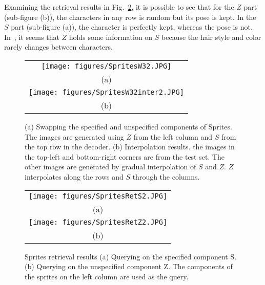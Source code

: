 \documentclass[10pt,twocolumn,letterpaper]{article}
\begin{document}
Examining the retrieval results in Fig.~\ref{fig3_Spritesret}, it is possible to see that for the $Z$ part (sub-figure (b)), the characters in any row is random but its pose is kept. In the $S$ part (sub-figure (a)), the character is perfectly kept, whereas the pose is not. In~\cite{disentanglement}, it seems that $Z$ holds some information on $S$ because the hair style and color rarely changes between characters. 


\begin{figure}[t]
  \centering
  \begin{tabular}{c}
  \texttt{[image: figures/SpritesW32.JPG]}\\(a)\\
  \texttt{[image: figures/SpritesW32inter2.JPG]}\\
    (b)\\
    \end{tabular}
  \caption{\label{fig2_Sprites} (a) Swapping the specified and unspecified components of Sprites. The images are generated using $Z$ from the left column and $S$ from the top row in the decoder. (b) Interpolation results. the images in the top-left and bottom-right corners are from the test set. The other images are generated by gradual interpolation of $S$ and $Z$. $Z$ interpolates along the rows and $S$ through the columns.}
\end{figure}

\begin{figure}[t]
  \centering
  \begin{tabular}{c}
  \texttt{[image: figures/SpritesRetS2.JPG]}\\(a)\\
  \texttt{[image: figures/SpritesRetZ2.JPG]}\\
    (b)\\
    \end{tabular}
  \caption{\label{fig3_Spritesret}Sprites retrieval results (a) Querying on the specified component S. (b) Querying on the unspecified component Z. The components of the sprites on the left column are used as the query. }
\end{figure}

\end{document}
